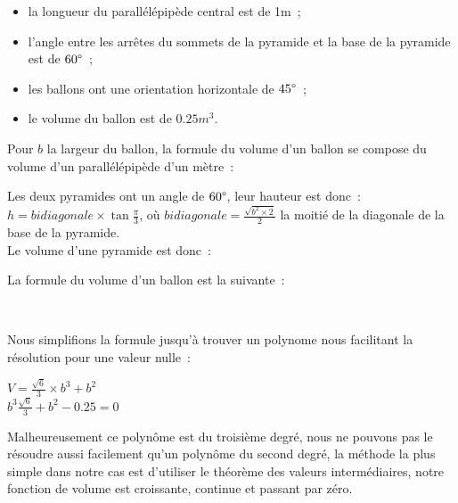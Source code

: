 \documentclass[a4paper,11pt]{article}
\begin{document}
\begin{itemize}
 \item la longueur du parallélépipède central est de 1m~;
 \item l'angle entre les arrêtes du sommets de la pyramide et la base de la pyramide est de $60 \degree$~;
 \item les ballons ont une orientation horizontale de $45 \degree$~;
 \item le volume du ballon est de $0.25m^3$.
\end{itemize}

\bigbreak

Pour $b$ la largeur du ballon, la formule du volume d'un ballon se compose du volume d'un parallélépipède d'un mètre~:

\begin{center}
\end{center}

Les deux pyramides ont un angle de $60 \degree$, leur hauteur est donc~: $\displaystyle{h = bidiagonale \times \tan{\frac{\pi}{3}}}$, où $\displaystyle{bidiagonale = \frac{\sqrt{b^2 \times 2}}{2}}$ la moitié de la diagonale de la base de la pyramide. \\
Le volume d'une pyramide est donc~:

\begin{center}
\end{center}

La formule du volume d'un ballon est la suivante~:

\begin{center}
	 \\
\end{center}

Nous simplifions la formule jusqu'à trouver un polynome nous facilitant la résolution pour une valeur nulle~:

\begin{center}
  $\displaystyle{V = \frac{\sqrt{6}}{3} \times b^3 + b^2 }$ \\
  $\displaystyle{b^3 \frac{\sqrt{6}}{3} + b^2 - 0.25 = 0}$
\end{center}

Malheureusement ce polynôme est du troisième degré, nous ne pouvons pas le résoudre aussi facilement qu'un polynôme du second degré, la méthode la plus simple dans notre cas est d'utiliser le théorème des valeurs intermédiaires, notre fonction de volume est croissante, continue et passant par zéro.
\end{document}
